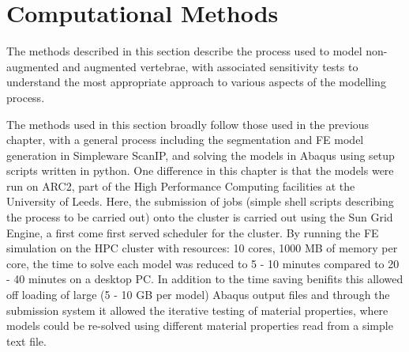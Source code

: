 \section{Computational Methods}

The methods described in this section describe the process used to model
non-augmented and augmented vertebrae, with associated sensitivity tests to
understand the most appropriate approach to various aspects of the modelling
process.


The methods used in this section broadly follow those used in the previous
chapter, with a general process including the segmentation and FE model
generation in Simpleware ScanIP, and solving the models in Abaqus using setup
scripts written in python. One difference in this chapter is that the models
were run on ARC2, part of the High Performance Computing facilities at the
University of Leeds. Here, the submission of jobs (simple shell scripts
describing the process to be carried out) onto the cluster is carried out using the Sun Grid
Engine, a first come first served scheduler for the cluster. By running the FE
simulation on the HPC cluster with resources: 10 cores, 1000 MB of memory per
core, the time to solve each model was reduced to 5 - 10 minutes compared to 20
- 40 minutes on a desktop PC. In addition to the time saving benifits this
allowed off loading of large (5 - 10 GB per model) Abaqus output files and
through the submission system it allowed the iterative testing of material
properties, where models could be re-solved using different material properties
read from a simple text file.

